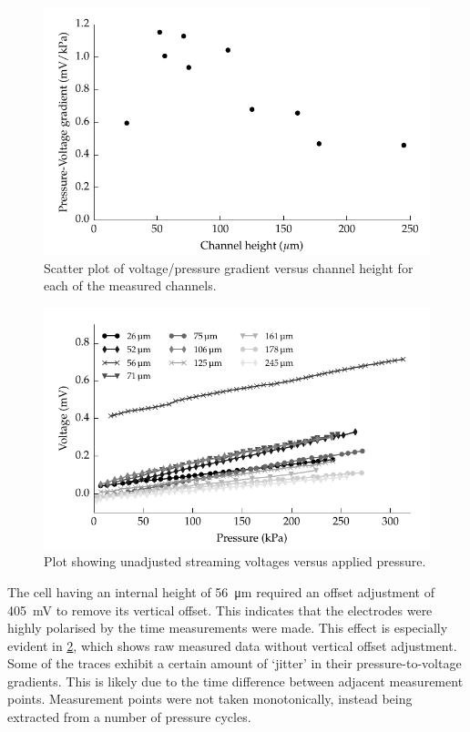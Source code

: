     \begin{figure}
        \centering
        \includegraphics{content/pt1/01-PowerHarvesting/graphics/streamingCell_slopeVsChannelHeight}
        \caption{\label{fig:streamingCell_scatter_voltGradVsHeight}Scatter plot of voltage/pressure gradient versus channel height for each of the measured channels.}
    \end{figure}

    \begin{figure}
        \centering
        \includegraphics{content/pt1/01-PowerHarvesting/graphics/graph_streamingVoltageGradient_vs_height_noCorrection}
        \caption{\label{fig:streamingCell_all_unadjusted}Plot showing unadjusted streaming voltages versus applied pressure.}
    \end{figure}

    The cell having an internal height of \SI{56}{\micro\meter} required an offset adjustment of \SI{405}{\milli\volt} to remove its vertical offset.
    This indicates that the electrodes were highly polarised by the time measurements were made.
    This effect is especially evident in \cref{fig:streamingCell_all_unadjusted}, which shows raw measured data without vertical offset adjustment.
    Some of the traces exhibit a certain amount of `jitter' in their pressure-to-voltage gradients.
    This is likely due to the time difference between adjacent measurement points.
    Measurement points were not taken monotonically, instead being extracted from a number of pressure cycles.

